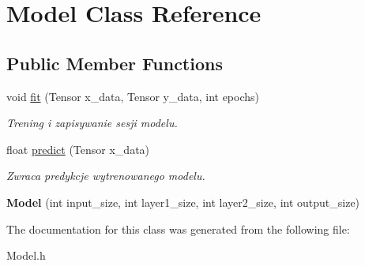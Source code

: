 \hypertarget{classModel}{}\section{Model Class Reference}
\label{classModel}
\subsection*{Public Member Functions}
\begin{DoxyCompactItemize}
\item 
\mbox{\label{classModel_ae512a2ec2f60666cdae555685549b1cc}} 
void \hyperlink{classModel_ae512a2ec2f60666cdae555685549b1cc}{fit} (Tensor x\+\_\+data, Tensor y\+\_\+data, int epochs)
\begin{DoxyCompactList}\small\item\em Trening i zapisywanie sesji modelu. \end{DoxyCompactList}\item 
\mbox{\label{classModel_aad2612f10e7ed2a0f7ad22ce99fc9630}} 
float \hyperlink{classModel_aad2612f10e7ed2a0f7ad22ce99fc9630}{predict} (Tensor x\+\_\+data)
\begin{DoxyCompactList}\small\item\em Zwraca predykcje wytrenowanego modelu. \end{DoxyCompactList}\item 
\mbox{\label{classModel_ab8a74fc79e8dab3b589ed63de60e8123}} 
{\bfseries Model} (int input\+\_\+size, int layer1\+\_\+size, int layer2\+\_\+size, int output\+\_\+size)
\end{DoxyCompactItemize}


The documentation for this class was generated from the following file\+:\begin{DoxyCompactItemize}
\item 
Model.\+h\end{DoxyCompactItemize}
